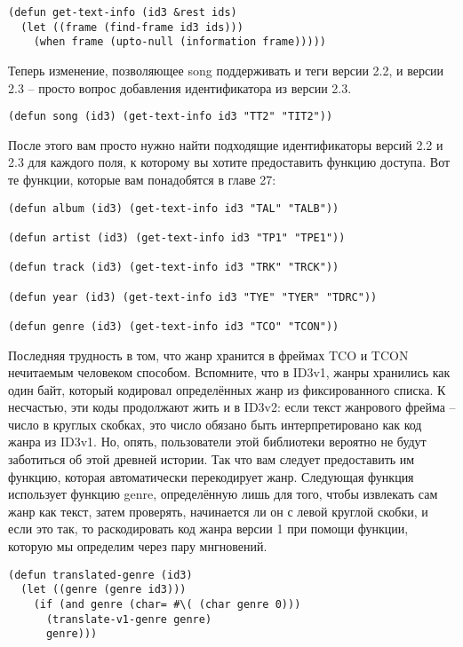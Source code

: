 \begin{lstlisting}
(defun get-text-info (id3 &rest ids)
  (let ((frame (find-frame id3 ids)))
    (when frame (upto-null (information frame)))))
\end{lstlisting}

Теперь изменение, позволяющее song поддерживать и теги версии 2.2, и версии 2.3 -- просто
вопрос добавления идентификатора из версии 2.3.

\begin{lstlisting}
(defun song (id3) (get-text-info id3 "TT2" "TIT2"))
\end{lstlisting}

После этого вам просто нужно найти подходящие идентификаторы версий 2.2 и 2.3 для каждого
поля, к которому вы хотите предоставить функцию доступа. Вот те функции, которые вам
понадобятся в главе 27:

\begin{lstlisting}
(defun album (id3) (get-text-info id3 "TAL" "TALB"))

(defun artist (id3) (get-text-info id3 "TP1" "TPE1"))

(defun track (id3) (get-text-info id3 "TRK" "TRCK"))

(defun year (id3) (get-text-info id3 "TYE" "TYER" "TDRC"))

(defun genre (id3) (get-text-info id3 "TCO" "TCON"))
\end{lstlisting}

Последняя трудность в том, что жанр хранится в фреймах TCO и TCON нечитаемым человеком
способом. Вспомните, что в ID3v1, жанры хранились как один байт, который кодировал
определённых жанр из фиксированного списка. К несчастью, эти коды продолжают жить и в
ID3v2: если текст жанрового фрейма -- число в круглых скобках, это число обязано быть
интерпретировано как код жанра из ID3v1. Но, опять, пользователи этой библиотеки вероятно
не будут заботиться об этой древней истории. Так что вам следует предоставить им функцию,
которая автоматически перекодирует жанр. Следующая функция использует функцию genre,
определённую лишь для того, чтобы извлекать сам жанр как текст, затем проверять,
начинается ли он с левой круглой скобки, и если это так, то раскодировать код жанра версии
1 при помощи функции, которую мы определим через пару мнгновений.

\begin{lstlisting}
(defun translated-genre (id3)
  (let ((genre (genre id3)))
    (if (and genre (char= #\( (char genre 0)))
      (translate-v1-genre genre)
      genre)))
\end{lstlisting}

